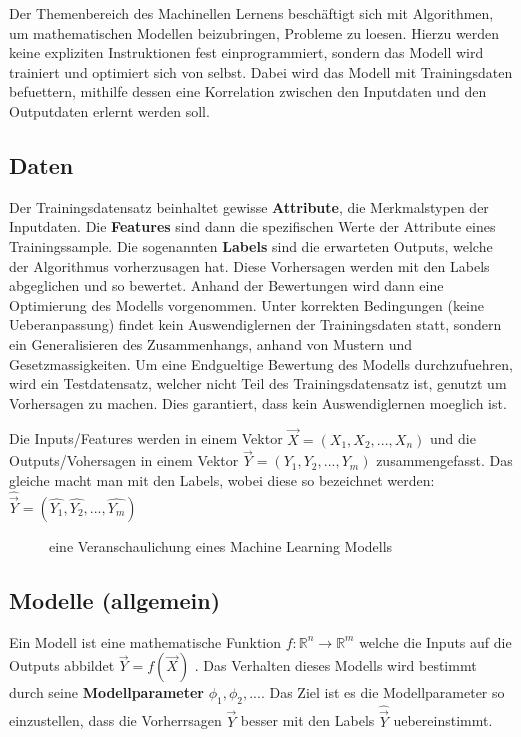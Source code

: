 \documentclass[../main]{subfiles}
\begin{document}
Der Themenbereich des Machinellen Lernens beschäftigt sich mit Algorithmen, um mathematischen Modellen beizubringen, Probleme zu loesen.
Hierzu werden keine expliziten Instruktionen fest einprogrammiert, sondern das Modell wird trainiert und optimiert sich von selbst.
Dabei wird das Modell mit Trainingsdaten befuettern, mithilfe dessen eine Korrelation zwischen den Inputdaten und den Outputdaten erlernt werden soll.

\subsection{Daten}

Der Trainingsdatensatz beinhaltet gewisse \textbf{Attribute}, die Merkmalstypen der Inputdaten. Die \textbf{Features} sind dann die spezifischen Werte der Attribute eines Trainingssample.
Die sogenannten \textbf{Labels} sind die erwarteten Outputs, welche der Algorithmus vorherzusagen hat. Diese Vorhersagen werden mit den Labels abgeglichen und so bewertet.
Anhand der Bewertungen wird dann eine Optimierung des Modells vorgenommen.
Unter korrekten Bedingungen (keine Ueberanpassung) findet kein Auswendiglernen der Trainingsdaten statt, sondern ein Generalisieren des Zusammenhangs, anhand von Mustern und Gesetzmassigkeiten.
Um eine Endgueltige Bewertung des Modells durchzufuehren, wird ein Testdatensatz, welcher nicht Teil des Trainingsdatensatz ist, genutzt um Vorhersagen zu machen. Dies garantiert, dass kein Auswendiglernen moeglich ist.

Die Inputs/Features werden in einem Vektor $\vec{X}=(X_1,X_2,...,X_n)$ und die Outputs/Vohersagen in einem Vektor $\vec{Y}=(Y_1,Y_2,...,Y_m)$ zusammengefasst.  Das gleiche macht man mit den Labels, wobei diese so bezeichnet werden: $\hat{\vec{Y}}=(\hat{Y_1},\hat{Y_2},...,\hat{Y_m})$


\begin{figure}[h!]
    \centering
    \begin{tikzpicture}[node distance=5cm,auto]
        
    \end{tikzpicture}
    
    \caption{eine Veranschaulichung eines Machine Learning Modells}
\end{figure}

\subsection{Modelle (allgemein)}
Ein Modell ist eine mathematische Funktion $\mathit{f}\colon \mathbb{R}^n \to \mathbb{R}^m$ welche die Inputs auf die Outputs abbildet $\vec{Y}=\mathit{f}(\vec{X})$ . Das Verhalten dieses Modells wird bestimmt durch seine \textbf{Modellparameter} $\phi_1, \phi_2, ...$. Das Ziel ist es die Modellparameter so einzustellen, dass die Vorherrsagen $\vec{Y}$ besser mit den Labels $\hat{\vec{Y}}$ uebereinstimmt.
\end{document}
